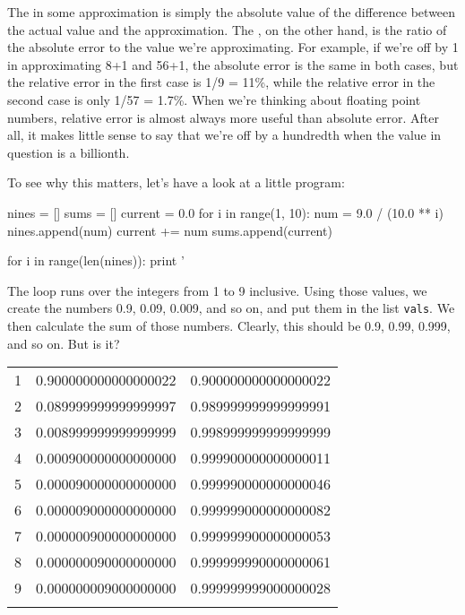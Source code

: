 \documentclass{book}
\begin{document}
The  in some approximation is
simply the absolute value of the difference between the actual value and
the approximation. The , on
the other hand, is the ratio of the absolute error to the value we're
approximating. For example, if we're off by 1 in approximating 8+1 and
56+1, the absolute error is the same in both cases, but the relative
error in the first case is 1/9 = 11\%, while the relative error in the
second case is only 1/57 = 1.7\%. When we're thinking about floating
point numbers, relative error is almost always more useful than absolute
error. After all, it makes little sense to say that we're off by a
hundredth when the value in question is a billionth.

To see why this matters, let's have a look at a little program:

\begin{VerbIn}
nines = []
sums = []
current = 0.0
for i in range(1, 10):
    num = 9.0 / (10.0 ** i)
    nines.append(num)
    current += num
    sums.append(current)

for i in range(len(nines)):
    print '%
\end{VerbIn}

The loop runs over the integers from 1 to 9 inclusive. Using those
values, we create the numbers 0.9, 0.09, 0.009, and so on, and put them
in the list \texttt{vals}. We then calculate the sum of those numbers.
Clearly, this should be 0.9, 0.99, 0.999, and so on. But is it?

\begin{tabular}{lll}
\hline\noalign{\medskip}
1 & 0.900000000000000022 & 0.900000000000000022
\\\noalign{\medskip}
2 & 0.089999999999999997 & 0.989999999999999991
\\\noalign{\medskip}
3 & 0.008999999999999999 & 0.998999999999999999
\\\noalign{\medskip}
4 & 0.000900000000000000 & 0.999900000000000011
\\\noalign{\medskip}
5 & 0.000090000000000000 & 0.999990000000000046
\\\noalign{\medskip}
6 & 0.000009000000000000 & 0.999999000000000082
\\\noalign{\medskip}
7 & 0.000000900000000000 & 0.999999900000000053
\\\noalign{\medskip}
8 & 0.000000090000000000 & 0.999999990000000061
\\\noalign{\medskip}
9 & 0.000000009000000000 & 0.999999999000000028
\\\noalign{\medskip}
\hline
\end{tabular}
\end{document}
